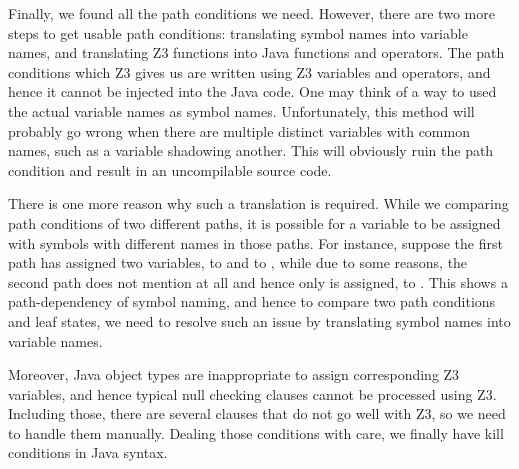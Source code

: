 \documentclass{article}
\begin{document}
\iffalse

kill condition 찾기 위해 했던 고군분투들(variable renaming etc.) 서술하기


Z3를 거치면 path condition들이 모두 symbol들로 기술되어 나온다. 그런데 이 symbol은 path에 dependent한 naming이기 때문에, original program의 path와 mutant program의 path의 path condition이나 path result를 단순히 symbol 이름으로만 비교해서는 안 된다. 그렇다고 해서 아예 Z3 variable 이름을 그 실제 변수 이름으로 바꾸면 이름이 같은 shadowing variable등을 처리할 때 문제가 생길 수 있으므로 그럴 수는 없다. 즉 Z3 변수 이름은 symbol 이름으로 유지하되 symbol 이름을 변수 이름으로 바꾸어주는 로직이 필요하고, path condition을 비교하거나 result가 같은지 다른지를 비교할 때에는 반드시 이 로직을 거쳐서 비교해야 한다.

또한 Z3로는 reference variables를 다루지 않으므로 예를 들어 nullity checking과 같은 레벨의 체크 역시 별도로 해주어야 한다.


\fi

Finally, we found all the path conditions we need. However, there are two more steps to get usable path conditions: translating symbol names into variable names, and translating Z3 functions into Java functions and operators. The path conditions which Z3 gives us are written using Z3 variables and operators, and hence it cannot be injected into the Java code. One may think of a way to used the actual variable names as symbol names. Unfortunately, this method will probably go wrong when there are multiple distinct variables with common names, such as a variable shadowing another. This will obviously ruin the path condition and result in an uncompilable source code.

There is one more reason why such a translation is required. While we comparing path conditions of two different paths, it is possible for a variable to be assigned with symbols with different names in those paths. For instance, suppose the first path has assigned two variables,  to  and  to , while due to some reasons, the second path does not mention  at all and hence only  is assigned, to . This shows a path-dependency of symbol naming, and hence to compare two path conditions and leaf states, we need to resolve such an issue by translating symbol names into variable names.

Moreover, Java object types are inappropriate to assign corresponding Z3 variables, and hence typical null checking clauses cannot be processed using Z3. Including those, there are several clauses that do not go well with Z3, so we need to handle them manually. Dealing those conditions with care, we finally have kill conditions in Java syntax.
\end{document}
